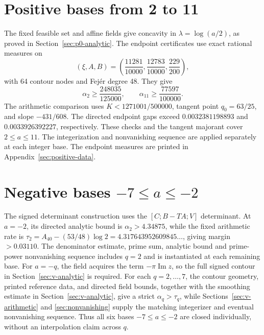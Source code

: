 \documentclass{amsart}
\numberwithin{equation}{section}
\numberwithin{table}{section}
\begin{document}


\section{Positive bases from 2 to 11}\label{sec:positive}
The fixed feasible set and affine fields give concavity in
\(\lambda=\log(a/2)\), as proved in Section~\ref{sec:p0-analytic}.  The
endpoint certificates use exact rational measures on
\[
 (\xi,A,B)=\left(\frac{11281}{10000},\frac{12783}{10000},\frac{229}{200}\right),
\]
with 64 contour nodes and Fej\'er degree 48.  They give
\[
 \alpha_2\ge\frac{248035}{125000},\qquad
 \alpha_{11}\ge\frac{77597}{100000}.
\]
The arithmetic comparison uses \(K<1271001/500000\), tangent point
\(q_0=63/25\), and slope \(-431/608\).  The directed endpoint gaps exceed
\(0.0032381198893\) and \(0.0033926392227\), respectively.  These checks and
the tangent majorant cover \(2\le a\le11\).  The integerization and
nonvanishing sequence are applied separately at each integer base.  The endpoint measures
are printed in Appendix~\ref{sec:positive-data}.

\section{Negative bases $-7\le a\le-2$}\label{sec:negative-middle}\label{sec:minus2}
The signed determinant construction uses the
\([C;B-TA;V]\) determinant.  At \(a=-2\), its directed analytic bound is
\(\alpha_2>4.34875\), while the fixed arithmetic rate is
\(\tau_2=A_{40}-(53/48)\log2=4.317643952609845\ldots\), giving margin
\(>0.03110\).  The denominator estimate, prime sum, analytic bound and
prime-power nonvanishing sequence includes \(q=2\) and is instantiated at each
remaining base.
For \(a=-q\), the field acquires the term \(-\pi\operatorname{Im}z\), so the
full signed contour in Section~\ref{sec:v-analytic} is required.  For each
\(q=2,\ldots,7\), the contour geometry, printed reference data, and directed
field bounds, together with the smoothing estimate in Section~\ref{sec:v-analytic}, give a
strict \(\alpha_q>\tau_q\), while Sections~\ref{sec:v-arithmetic} and
\ref{sec:nonvanishing} supply the matching integerizer and eventual
nonvanishing sequence.
Thus all six bases \(-7\le a\le-2\) are closed individually, without an
interpolation claim across \(q\).





\end{document}
